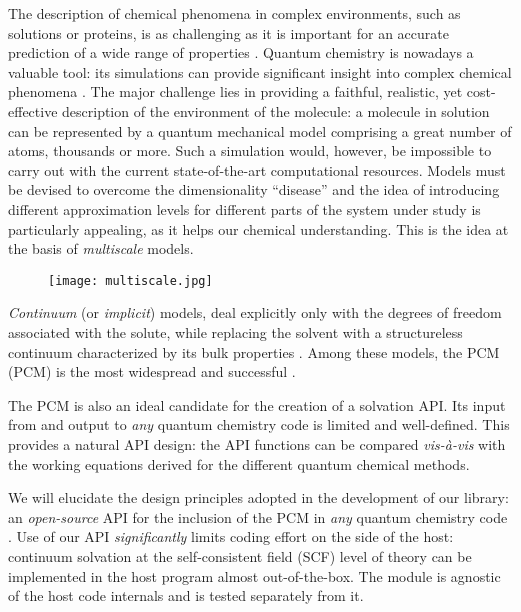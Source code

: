 The description of chemical phenomena in complex environments, such as
solutions or proteins, is as challenging as it is important
for an accurate prediction of a wide range of properties
\cite{Reichardt2010}. Quantum chemistry is nowadays a valuable
tool: its simulations can provide significant insight into complex
chemical phenomena \cite{Nobel1998, Nobel2013}.
The major challenge lies in providing a faithful, realistic, yet cost-effective
description of the environment of the molecule:
a molecule in solution can be represented by a quantum mechanical model
comprising a great number of atoms, thousands or more. Such a simulation would,
however, be impossible to carry out with the current state-of-the-art
computational resources.
Models must be devised to overcome the dimensionality ``disease'' and
the idea of introducing different approximation levels for different
parts of the system under study is particularly appealing, as it helps
our chemical understanding. This is the idea at the basis of
\emph{multiscale} models.

\begin{figure}[!htb]
  \centering
  \texttt{[image: multiscale.jpg]}
\end{figure}

\emph{Continuum} (or \emph{implicit}) models, deal explicitly
only with the degrees of freedom associated with the solute, while
replacing the solvent with a structureless continuum characterized by
its bulk properties \cite{Onsager1936}. Among these models, the \acl{PCM} (\acs{PCM})
is the most widespread and successful \cite{Tomasi2005, mennucci}.

The \acs{PCM} is also an ideal candidate for the creation of a solvation API.
Its input from and output to \emph{any} quantum chemistry code is
limited and well-defined.
This provides a natural API design: the API functions can be compared
\emph{vis-à-vis} with the working equations derived for the different
quantum chemical methods.

We will elucidate the design principles adopted in the development of our
\pcmsolver{} library: an \emph{open-source} API for the inclusion of the
PCM in \emph{any} quantum chemistry code \cite{PCMSolver}.  Use of our
API \emph{significantly} limits coding effort on the side of the host:
continuum solvation at the self-consistent field
(SCF) level of theory can be implemented in the host program almost out-of-the-box.  The module is
agnostic of the host code internals and is tested separately from it.

